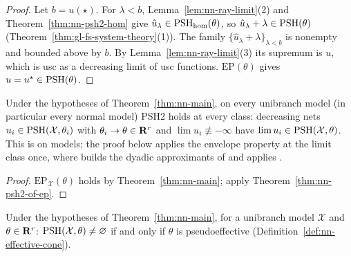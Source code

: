 \begin{proof}
Let $b=u(\star)$. For $\lambda<b$, Lemma~\ref{lem:nn-ray-limit}(2) and Theorem~\ref{thm:nn-psh2-hom} give $\hat u_\lambda\in\operatorname{PSH}_{\mathrm{hom}}(\theta)$, so
$\hat u_\lambda+\lambda\in\operatorname{PSH}(\theta)$ (Theorem~\ref{thm:gl-fs-system-theory}(1)). The family $\{\hat u_\lambda+\lambda\}_{\lambda<b}$ is nonempty and bounded above by $b$. By
Lemma~\ref{lem:nn-ray-limit}(3) its supremum is $u$, which is usc as a decreasing limit of usc functions. $\mathrm{EP}(\theta)$ gives $u=u^\star\in\operatorname{PSH}(\theta)$.
\end{proof}

\begin{corollary}\label{cor:nn-psh2-unibranch}
\leanok
{}
Under the hypotheses of Theorem~\ref{thm:nn-main}, on every unibranch model (in particular every normal model) PSH2 holds at every class: decreasing nets
$u_i\in\operatorname{PSH}(\mathcal X,\theta_i)$ with $\theta_i\to\theta\in\mathbf{R}^r$ and $\lim u_i\not\equiv-\infty$ have $\lim u_i\in\operatorname{PSH}(\mathcal X,\theta)$. This is
\cite[Corollary~8.4]{FHX} on models; the proof below applies the envelope property at the limit class once, where \cite{FHX} builds
the dyadic approximants of \cite[Proposition~7.5]{FHX} and applies \cite[Lemma~7.4]{FHX}.
\end{corollary}

\begin{proof}
$\mathrm{EP}_{\mathcal X}(\theta)$ holds by Theorem~\ref{thm:nn-main}; apply Theorem~\ref{thm:nn-psh2-of-ep}.
\end{proof}

\begin{corollary}\label{cor:nn-psef}
\leanok
{}
Under the hypotheses of Theorem~\ref{thm:nn-main}, for a unibranch model $\mathcal X$ and $\theta\in\mathbf{R}^r$: $\operatorname{PSH}(\mathcal X,\theta)\ne\varnothing$ if and only if
$\theta$ is pseudoeffective (Definition~\ref{def:nn-effective-cone}).
\end{corollary}

